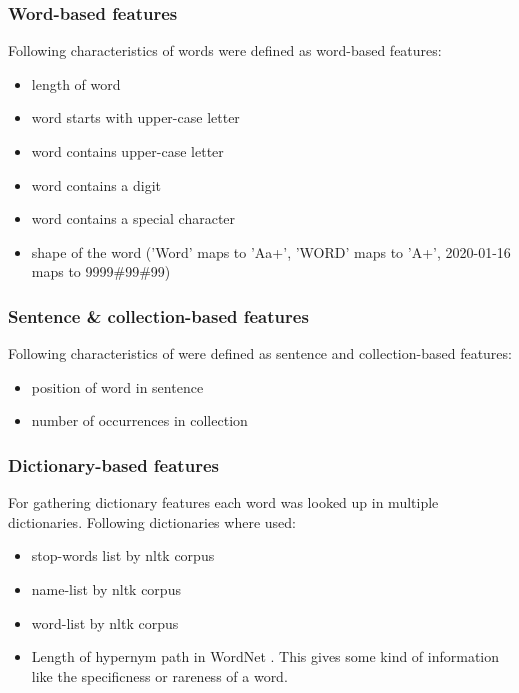 \documentclass[12pt]{book}
\begin{document}
	\subsubsection{Word-based features}
	
	Following characteristics of words were defined as word-based features:
	\begin{itemize}
		\item length of word
		\item word starts with upper-case letter
		\item word contains upper-case letter
		\item word contains a digit
		\item word contains a special character
		\item shape of the word ('Word' maps to 'Aa+', 'WORD' maps to 'A+', 2020-01-16 maps to 9999\#99\#99)
	\end{itemize}
	
	\subsubsection{Sentence \& collection-based features}
	
	Following characteristics of were defined as sentence and collection-based features:
	\begin{itemize}
		\item position of word in sentence
		\item number of occurrences in collection
	\end{itemize}
	
	\subsubsection{Dictionary-based features}
	
	For gathering dictionary features each word was looked up in multiple dictionaries. Following dictionaries where used:
	\begin{itemize}
		\item stop-words list by nltk corpus
		\item name-list by nltk corpus
		\item word-list by nltk corpus
		\item Length of hypernym path in WordNet \cite{wordnet}. This gives some kind of information like the specificness or rareness of a word.
	\end{itemize}
	
\end{document}
